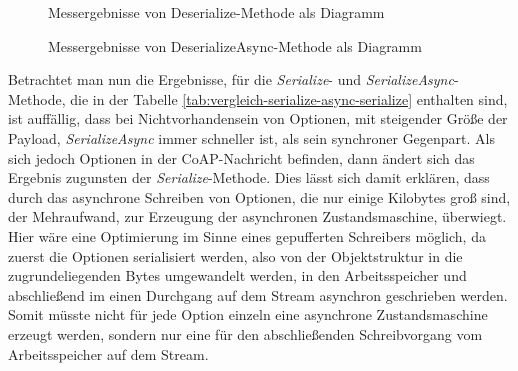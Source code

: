 \begin{figure}[h]
    \centering
    \caption{Messergebnisse von Deserialize-Methode als Diagramm}
    \label{fig:messergebnisse-deserialize}
\end{figure}

\begin{figure}[h]
    \centering
    \caption{Messergebnisse von DeserializeAsync-Methode als Diagramm}
    \label{fig:messergebnisse-deserialize-async}
\end{figure}

Betrachtet man nun die Ergebnisse, für die \textit{Serialize}- und \textit{SerializeAsync}-Methode, die in der Tabelle \ref{tab:vergleich-serialize-async-serialize} enthalten sind, ist auffällig, dass bei Nichtvorhandensein von Optionen, mit steigender Größe der Payload, \textit{SerializeAsync} immer schneller ist, als sein synchroner Gegenpart. Als sich jedoch Optionen in der CoAP-Nachricht befinden, dann ändert sich das Ergebnis zugunsten der \textit{Serialize}-Methode. Dies lässt sich damit erklären, dass durch das asynchrone Schreiben von Optionen, die nur einige Kilobytes groß sind, der Mehraufwand, zur Erzeugung der asynchronen Zustandsmaschine, überwiegt. Hier wäre eine Optimierung im Sinne eines gepufferten Schreibers möglich, da zuerst die Optionen serialisiert werden, also von der Objektstruktur in die zugrundeliegenden Bytes umgewandelt werden, in den Arbeitsspeicher und abschließend im einen Durchgang auf dem Stream asynchron geschrieben werden. Somit müsste nicht für jede Option einzeln eine asynchrone Zustandsmaschine erzeugt werden, sondern nur eine für den abschließenden Schreibvorgang vom Arbeitsspeicher auf dem Stream.

